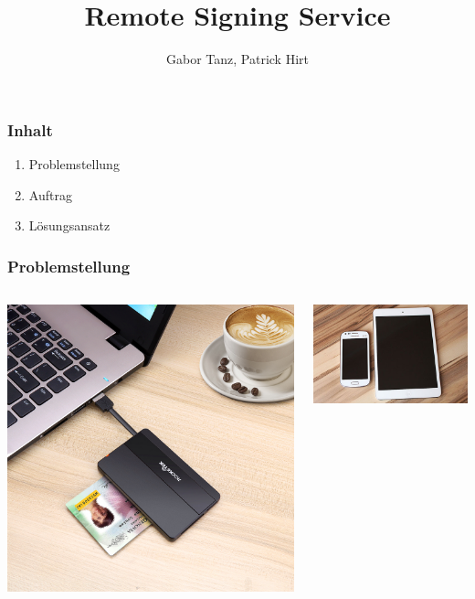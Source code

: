\documentclass[12pt,xcolor=pdftex,dvipsnames,table]{beamer}
\title{Remote Signing Service}
\author{Gabor Tanz, Patrick Hirt}
\begin{document}
    \begin{frame}
        \titlepage
    \end{frame}

    \begin{frame}
        \frametitle{Inhalt}
        \begin{enumerate}
            \item Problemstellung
            \item Auftrag
            \item Lösungsansatz
        \end{enumerate}
    \end{frame}

    \begin{frame}
        \frametitle{Problemstellung}
        \begin{columns}[T]
            \begin{column}{0.5\textwidth}
                \includegraphics[width=\textwidth]{images/cardreader.jpg}
            \end{column}
            \begin{column}{0.5\textwidth}
                \includegraphics[width=\textwidth]{images/tablet-smartphone.jpg}

\end{column}
\end{columns}
\end{frame}
\end{document}
